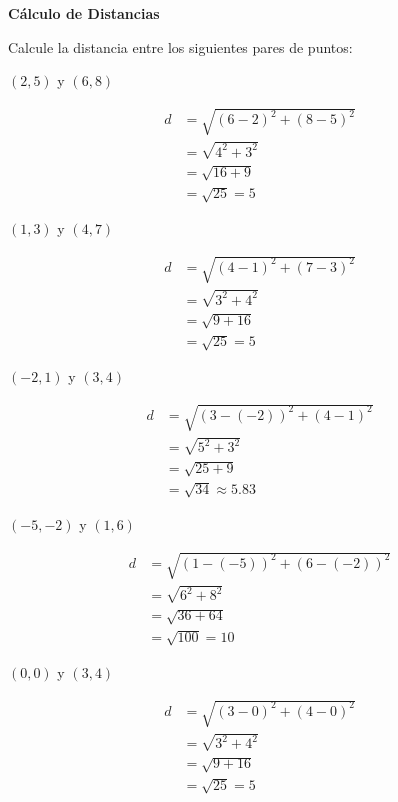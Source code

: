 \begin{exercise}
\textbf{Cálculo de Distancias}

Calcule la distancia entre los siguientes pares de puntos:

\problem $(2, 5)$ y $(6, 8)$
\begin{solucion}
\begin{align*}
d &= \sqrt{(6-2)^2 + (8-5)^2} \\
  &= \sqrt{4^2 + 3^2} \\
  &= \sqrt{16 + 9} \\
  &= \sqrt{25} = 5
\end{align*}
\end{solucion}

\problem $(1, 3)$ y $(4, 7)$
\begin{solucion}
\begin{align*}
d &= \sqrt{(4-1)^2 + (7-3)^2} \\
  &= \sqrt{3^2 + 4^2} \\
  &= \sqrt{9 + 16} \\
  &= \sqrt{25} = 5
\end{align*}
\end{solucion}

\problem $(-2, 1)$ y $(3, 4)$
\begin{solucion}
\begin{align*}
d &= \sqrt{(3-(-2))^2 + (4-1)^2} \\
  &= \sqrt{5^2 + 3^2} \\
  &= \sqrt{25 + 9} \\
  &= \sqrt{34} \approx 5.83
\end{align*}
\end{solucion}

\problem $(-5, -2)$ y $(1, 6)$
\begin{solucion}
\begin{align*}
d &= \sqrt{(1-(-5))^2 + (6-(-2))^2} \\
  &= \sqrt{6^2 + 8^2} \\
  &= \sqrt{36 + 64} \\
  &= \sqrt{100} = 10
\end{align*}
\end{solucion}

\problem $(0, 0)$ y $(3, 4)$
\begin{solucion}
\begin{align*}
d &= \sqrt{(3-0)^2 + (4-0)^2} \\
  &= \sqrt{3^2 + 4^2} \\
  &= \sqrt{9 + 16} \\
  &= \sqrt{25} = 5
\end{align*}
\end{solucion}


\end{exercise}
